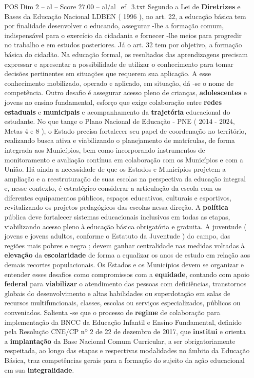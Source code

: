 \begin{textsample}{POS Dim 2 – al – Score 27.00 – al/al\_ef\_3.txt}
Segundo a Lei de \textbf{Diretrizes} e Bases da Educação Nacional LDBEN ( 1996 ), no art. 22, a educação básica tem por finalidade desenvolver o educando, assegurar -lhe a formação comum, indispensável para o exercício da cidadania e fornecer -lhe meios para progredir no trabalho e em estudos posteriores.
Já o art. 32 tem por objetivo, a formação básica do cidadão.
Na educação formal, os resultados das aprendizagens precisam expressar e apresentar a possibilidade de utilizar o conhecimento para tomar decisões pertinentes em situações que requerem sua aplicação.
A esse conhecimento mobilizado, operado e aplicado, em situação, dá -se o nome de competência.
Outro desafio é assegurar acesso pleno de crianças, \textbf{adolescentes} e jovens no ensino fundamental, esforço que exige colaboração entre \textbf{redes} \textbf{estaduais} e \textbf{municipais} e acompanhamento da \textbf{trajetória} educacional do estudante.
No que tange o Plano Nacional de Educação - PNE ( 2014 - 2024, Metas 4 e 8 ), o Estado precisa fortalecer seu papel de coordenação no território, realizando busca ativa e viabilizando o planejamento de matrículas, de forma integrada aos Municípios, bem como incorporando instrumentos de monitoramento e avaliação contínua em colaboração com os Municípios e com a União.
Há ainda a necessidade de que os Estados e Municípios projetem a ampliação e a reestruturação de suas escolas na perspectiva da educação integral e, nesse contexto, é estratégico considerar a articulação da escola com os diferentes equipamentos públicos, espaços educativos, culturais e esportivos, revitalizando os projetos pedagógicos das escolas nessa direção.
A \textbf{política} pública deve fortalecer sistemas educacionais inclusivos em todas as etapas, viabilizando acesso pleno à educação básica obrigatória e gratuita.
A juventude ( jovens e jovens adultos, conforme o Estatuto da Juventude ) do campo, das regiões mais pobres e negra ; devem ganhar centralidade nas medidas voltadas à \textbf{elevação} da \textbf{escolaridade} de forma a equalizar os anos de estudo em relação aos demais recortes populacionais.
Os Estados e os Municípios devem se organizar e entender esses desafios como compromissos com a \textbf{equidade}, contando com apoio \textbf{federal} para \textbf{viabilizar} o atendimento das pessoas com deficiências, transtornos globais do desenvolvimento e altas habilidades ou superdotação em salas de recursos multifuncionais, classes, escolas ou serviços especializados, públicos ou conveniados.
Salienta -se que o processo de \textbf{regime} de colaboração para implementação da BNCC da Educação Infantil e Ensino Fundamental, definido pela Resolução CNE/CP nº 2 de 22 de dezembro de 2017, que \textbf{institui} e orienta a \textbf{implantação} da Base Nacional Comum Curricular, a ser obrigatoriamente respeitada, ao longo das etapas e respectivas modalidades no âmbito da Educação Básica, traz competências gerais para a formação do sujeito da ação educacional em sua \textbf{integralidade}.

\end{textsample}
